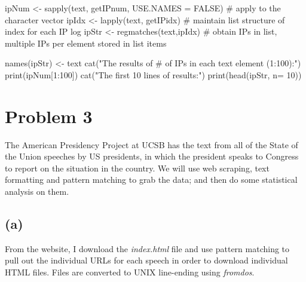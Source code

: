 \documentclass{article}
\begin{document}
ipNum <- sapply(text, getIPnum, USE.NAMES = FALSE) # apply to the character vector
ipIdx <- lapply(text, getIPidx) # maintain list structure of index for each IP log
ipStr <- regmatches(text,ipIdx) # obtain IPs in list, multiple IPs per element stored in list items

names(ipStr) <- text
cat("The results of # of IPs in each text element (1:100):\n")
print(ipNum[1:100])
cat("The first 10 lines of results:\n")
print(head(ipStr, n= 10))




\newpage

\section*{Problem 3}

The American Presidency Project at UCSB has the text from all of the State of the Union
speeches by US presidents, in which the president speaks to Congress to report on the 
situation in the country. We will use web scraping, text formatting and pattern matching 
to grab the data; and then do some statistical analysis on them.

\subsection*{(a)}

From the website, I download the \textit{index.html} file and use pattern matching
to pull out the individual URLs for each speech in order to download individual HTML files.
Files are converted to UNIX line-ending using \textit{fromdos}.
\end{document}

